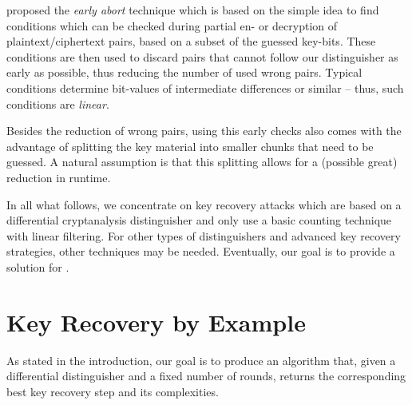 \textcite{RSA:LKKD08} proposed the \emph{early abort} technique which is based on the simple idea to find conditions which can be checked during partial en- or decryption of plaintext/ciphertext pairs, based on a subset of the guessed key-bits.
These conditions are then used to discard pairs that cannot follow our distinguisher as early as possible, thus reducing the number of used wrong pairs.
Typical conditions determine bit-values of intermediate differences or similar -- thus, such conditions are \emph{linear}.

Besides the reduction of wrong pairs, using this early checks also comes with the advantage of splitting the key material into smaller chunks that need to be guessed.
A natural assumption is that this splitting allows for a (possible great) reduction in runtime.

In all what follows, we concentrate on key recovery attacks which are based on a differential cryptanalysis distinguisher and only use a basic counting technique with linear filtering.
For other types of distinguishers and advanced key recovery strategies, other techniques may be needed.
Eventually, our goal is to provide a solution for .

\section{Key Recovery by Example}

As stated in the introduction, our goal is to produce an algorithm that, given a differential distinguisher and a fixed number of rounds, returns the corresponding best key recovery step and its complexities.


